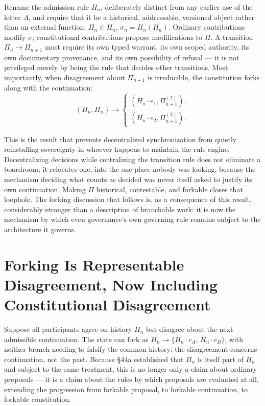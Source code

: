 \documentclass[12pt]{article}
\begin{document}
Rename the admission rule $\Pi_n$, deliberately distinct from any earlier use of the letter $A$, and require that it be a historical, addressable, versioned object rather than an external function: $\Pi_n\in H_n$, $\sigma_n=\Pi_n(H_n)$. Ordinary contributions modify $\sigma$; constitutional contributions propose modifications to $\Pi$. A transition $\Pi_n\to\Pi_{n+1}$ must require its own typed warrant, its own scoped authority, its own documentary provenance, and its own possibility of refusal — it is not privileged merely by being the rule that decides other transitions. Most importantly, when disagreement about $\Pi_{n+1}$ is irreducible, the constitution forks along with the continuation:
\[
(H_n,\Pi_n)\longrightarrow
\begin{cases}
(H_n\cdot e_1,\Pi_{n+1}^{(1)}),\\
(H_n\cdot e_2,\Pi_{n+1}^{(2)}).
\end{cases}
\]

This is the result that prevents decentralized synchronization from quietly reinstalling sovereignty in whoever happens to maintain the rule engine. Decentralizing decisions while centralizing the transition rule does not eliminate a boardroom; it relocates one, into the one place nobody was looking, because the mechanism deciding what counts as decided was never itself asked to justify its own continuation. Making $\Pi$ historical, contestable, and forkable closes that loophole. The forking discussion that follows is, as a consequence of this result, considerably stronger than a description of branchable work: it is now the mechanism by which even governance's own governing rule remains subject to the architecture it governs.

\section{Forking Is Representable Disagreement, Now Including Constitutional Disagreement}

Suppose all participants agree on history $H_n$ but disagree about the next admissible continuation. The state can fork as $H_n\to\{H_n\cdot c_A,\,H_n\cdot c_B\}$, with neither branch needing to falsify the common history; the disagreement concerns continuation, not the past. Because \S44a established that $\Pi_n$ is itself part of $H_n$ and subject to the same treatment, this is no longer only a claim about ordinary proposals — it is a claim about the rules by which proposals are evaluated at all, extending the progression from forkable proposal, to forkable continuation, to forkable constitution.
\end{document}

